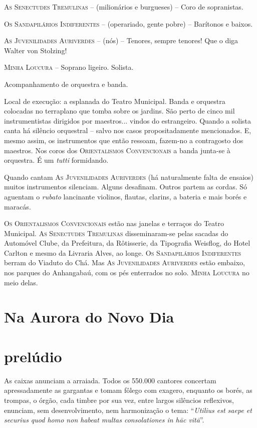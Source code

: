 \textsc{As Senectudes Tremulinas} -- (milionários e burgueses) -- Coro
de sopranistas.

\textsc{Os Sandapilários Indiferentes} -- (operariado, gente pobre) --
Barítonos e baixos.

\textsc{As Juvenilidades Auriverdes} -- (nós) -- Tenores, sempre
tenores! Que o diga Walter von Stolzing!

\textsc{Minha Loucura} -- Soprano ligeiro. Solista.

Acompanhamento de orquestra e banda.

Local de execução: a esplanada do Teatro Municipal. Banda e orquestra
colocadas no terraplano que tomba sobre os jardins. São perto de cinco
mil instrumentistas dirigidos por maestros... vindos do estrangeiro.
Quando a solista canta há silêncio orquestral -- salvo nos casos
propositadamente mencionados. E, mesmo assim, os instrumentos que então
ressoam, fazem-no a contragosto dos maestros. Nos coros dos
\textsc{Orientalismos Convencionais} a banda junta-se à orquestra. É um
\emph{tutti} formidando.

Quando cantam \textsc{As Juvenilidades Auriverdes} (há
naturalmente falta de ensaios) muitos instrumentos silenciam. Alguns
desafinam. Outros partem as cordas. Só aguentam o \emph{rubato}
lancinante violinos, flautas, clarins, a bateria e mais borés e maracás.

\textsc{Os Orientalismos Convencionais} estão nas janelas e terraços do
Teatro Municipal. \textsc{As Senectudes Tremulinas} disseminaram-se
pelas sacadas do Automóvel Clube, da Prefeitura, da Rôtisserie, da
Tipografia Weisflog, do Hotel Carlton e mesmo da Livraria Alves, ao
longe. \textsc{Os Sandapilários Indiferentes} berram do Viaduto do Chá.
Mas \textsc{As Juvenilidades Auriverdes} estão embaixo, nos parques do
Anhangabaú, com os pés enterrados no solo. \textsc{Minha Loucura} no
meio delas.

\section*{Na Aurora do Novo Dia}

\section*{prelúdio}

As caixas anunciam a arraiada. Todos os 550.000 cantores concertam
apressadamente as gargantas e tomam fôlego com exagero, enquanto os
borés, as trompas, o órgão, cada timbre por sua vez, entre largos
silêncios reflexivos, enunciam, sem desenvolvimento, nem harmonização o
tema: ``\emph{Utilius est saepe et securius quod homo non habeat multas
consolationes in hāc vitā}''.

